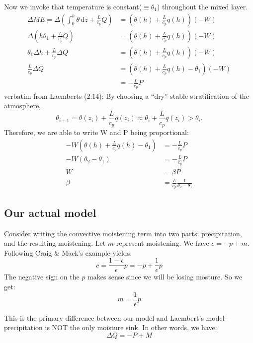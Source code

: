 \documentclass[10pt]{article}
\newcommand{\rmd}{\,\mathrm{d}}
\begin{document}
Now we invoke that temperature is constant($\equiv \theta_1$) throughout the mixed layer. 
\begin{align*}
\Delta ME = \Delta\left(\int_{0}^{h} \theta \rmd z + \frac{L}{c_p}Q \right) &= (\theta(h) + \frac{L}{c_p} q(h))(-W)\\
\Delta\left(h\theta_1+ \frac{L}{c_p}Q \right)&= (\theta(h) + \frac{L}{c_p} q(h))(-W)\\
\theta_1 \Delta h + \frac{L}{c_p}\Delta Q &= (\theta(h) + \frac{L}{c_p} q(h))(-W)\\
\frac{L}{c_p} \Delta Q &= (\theta(h) + \frac{L}{c_p} q(h) - \theta_1)(-W)\\
&= -\frac{L}{c_p}P
\end{align*}
verbatim from Laemberts (2.14): By choosing a ``dry'' stable stratification of the atmosphere, 
\begin{equation}
\theta_{i+1} = \theta(z_i) + \frac{L}{c_p}q(z_i) \approx \theta_i + \frac{L}{c_p}q(z_i) > \theta_i. 
\end{equation}
Therefore, we are able to write W and P being proportional:
\begin{align*}
-W(\theta(h) + \frac{L}{c_p} q(h) - \theta_1) &= -\frac{L}{c_p}P\\
-W(\theta_2 - \theta_1) &= -\frac{L}{c_p}P \\
W &= \beta P \\
\beta &= \frac{L}{c_p}\frac{1}{\theta_2-\theta_1}
\end{align*}

\subsection{Our actual model}
Consider writing the convective moistening term into two parts: precipitation, and the resulting moistening. Let $m$ represent moistening.
We have $c = -p + m$. Following Craig \& Mack's example yields: 
\begin{equation}
c = \frac{1-\epsilon}{\epsilon} p = -p + \frac{1}{\epsilon}p
\end{equation}
The negative sign on the $p$ makes sense since we will be losing mosture. So we get:
\begin{equation}
m = \frac{1}{\epsilon} p
\end{equation}

This is the primary difference between our model and Laembert's model-- precipitation is NOT the only moisture sink. In other words, we have:
\begin{equation}
\Delta Q = -P + M
\label{neweq}
\end{equation}
\end{document}
